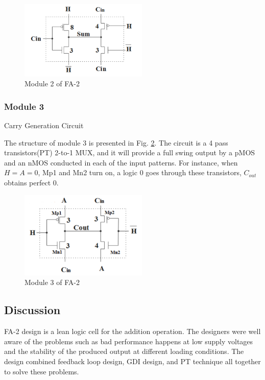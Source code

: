 \documentclass[conference]{IEEEtran}
\begin{document}
\begin{figure}[!ht]
	\centering
	\includegraphics[width=2.4in]{fa2-m2.png}
	\caption{Module 2 of FA-2}
	\label{fig:fa2-m2}
\end{figure}

\subsubsection{Module 3} Carry Generation Circuit

The structure of module 3 is presented in Fig. \ref{fig:fa2-m3}.
The circuit is a 4 pass transistors(PT) 2-to-1 MUX, and it will provide a full swing output by a pMOS and an nMOS conducted in each of the input patterns.
For instance, when \(H = A = 0\), Mp1 and Mn2 turn on, a logic 0 goes through these transistors, \(C_{out}\) obtains perfect 0.

\begin{figure}[!ht]
	\centering
	\includegraphics[width=2.4in]{fa2-m3.png}
	\caption{Module 3 of FA-2}
	\label{fig:fa2-m3}
\end{figure}

\newpage

\subsection{Discussion}

FA-2 design is a lean logic cell for the addition operation.
The designers were well aware of the problems such as bad performance happens at low supply voltages
and the stability of the produced output at different loading conditions.
The design combined feedback loop design, GDI design, and PT technique all together to solve these problems.
\end{document}
